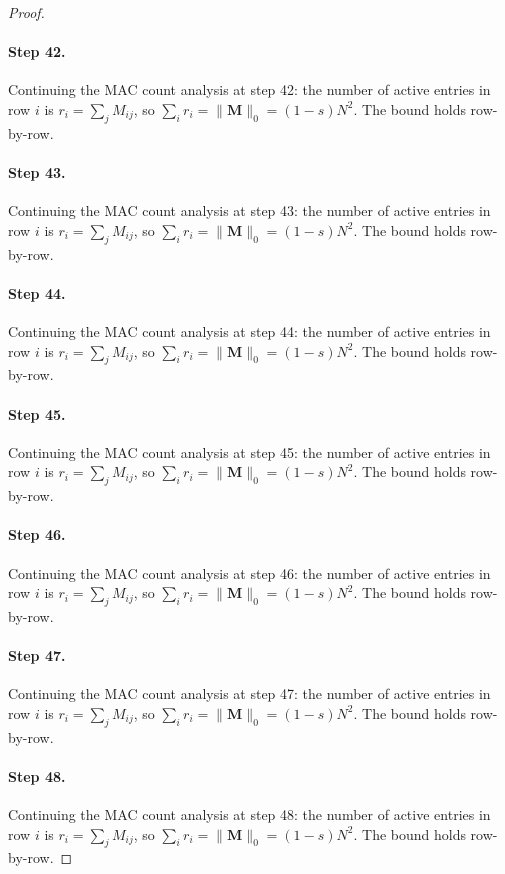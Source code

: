 \begin{proof}
\paragraph{Step 42.}
Continuing the MAC count analysis at step 42:
the number of active entries in row $i$ is $r_i = \sum_j M_{ij}$, so
$\sum_i r_i = \|\mathbf{M}\|_0 = (1-s)N^2$.  The bound holds row-by-row.

\paragraph{Step 43.}
Continuing the MAC count analysis at step 43:
the number of active entries in row $i$ is $r_i = \sum_j M_{ij}$, so
$\sum_i r_i = \|\mathbf{M}\|_0 = (1-s)N^2$.  The bound holds row-by-row.

\paragraph{Step 44.}
Continuing the MAC count analysis at step 44:
the number of active entries in row $i$ is $r_i = \sum_j M_{ij}$, so
$\sum_i r_i = \|\mathbf{M}\|_0 = (1-s)N^2$.  The bound holds row-by-row.

\paragraph{Step 45.}
Continuing the MAC count analysis at step 45:
the number of active entries in row $i$ is $r_i = \sum_j M_{ij}$, so
$\sum_i r_i = \|\mathbf{M}\|_0 = (1-s)N^2$.  The bound holds row-by-row.

\paragraph{Step 46.}
Continuing the MAC count analysis at step 46:
the number of active entries in row $i$ is $r_i = \sum_j M_{ij}$, so
$\sum_i r_i = \|\mathbf{M}\|_0 = (1-s)N^2$.  The bound holds row-by-row.

\paragraph{Step 47.}
Continuing the MAC count analysis at step 47:
the number of active entries in row $i$ is $r_i = \sum_j M_{ij}$, so
$\sum_i r_i = \|\mathbf{M}\|_0 = (1-s)N^2$.  The bound holds row-by-row.

\paragraph{Step 48.}
Continuing the MAC count analysis at step 48:
the number of active entries in row $i$ is $r_i = \sum_j M_{ij}$, so
$\sum_i r_i = \|\mathbf{M}\|_0 = (1-s)N^2$.  The bound holds row-by-row.


\end{proof}

